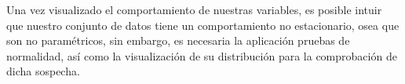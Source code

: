 \documentclass[conference]{IEEEtran}
\begin{document}

Una vez visualizado el comportamiento de nuestras variables, es posible intuir que nuestro conjunto de datos tiene un comportamiento no estacionario, osea que son no paramétricos, sin embargo, es necesaria la aplicación pruebas de normalidad, así como la visualización de su distribución para la comprobación de dicha sospecha.
\end{document}
